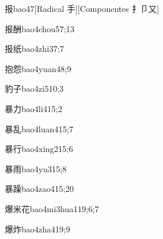 \begin{verbete}{报}{bao4}{7}[Radical 手][Componentes 扌卩又]
\end{verbete}

\begin{verbete}{报酬}{bao4chou5}{7;13}
\end{verbete}

\begin{verbete}{报纸}{bao4zhi3}{7;7}
\end{verbete}

\begin{verbete}{抱怨}{bao4yuan4}{8;9}
\end{verbete}

\begin{verbete}{豹子}{bao4zi5}{10;3}
\end{verbete}

\begin{verbete}{暴力}{bao4li4}{15;2}
\end{verbete}

\begin{verbete}{暴乱}{bao4luan4}{15;7}
\end{verbete}

\begin{verbete}{暴行}{bao4xing2}{15;6}
\end{verbete}

\begin{verbete}{暴雨}{bao4yu3}{15;8}
\end{verbete}

\begin{verbete}{暴躁}{bao4zao4}{15;20}
\end{verbete}

\begin{verbete}{爆米花}{bao4mi3hua1}{19;6;7}
\end{verbete}

\begin{verbete}{爆炸}{bao4zha4}{19;9}
\end{verbete}

